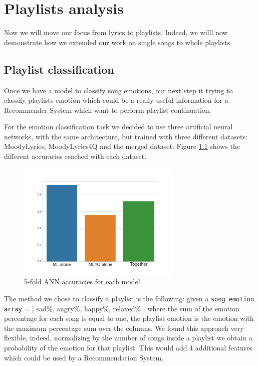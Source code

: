 \chapter{Playlists analysis}

Now we will move our focus from lyrics to playlists. Indeed, we willl now demonstrate how we extended our work on single songs to whole playlists.

\section{Playlist classification}

Once we have a model to classify song emotions, our next step it trying to classify playlists emotion which could be a really useful information for a Recommender System which want to perform playlist continuation.

For the emotion classification task we decided to use three artificial neural networks, with the same architecture, but trained with three different datasets: MoodyLyrics, MoodyLyrics4Q and the merged dataset. Figure \ref{fig:annacc} shows the different accuracies reached with each dataset. 

\begin{figure}[H]
\centering
\includegraphics[width=0.7\textwidth]{./chapters/chapter5/images/ANN_accuracies.png}
\caption{5-fold ANN accuracies for each model}
\label{fig:annacc}
\end{figure}

The method we chose to classify a playlist is the following: given a \texttt{song emotion array} = [ sad\%, angry\%, happy\%, relaxed\% ] where the sum of the emotion percentage for each song is equal to one, the playlist emotion is the emotion with the maximum percentage sum over the columns. We found this approach very flexible, indeed, normalizing by the number of songs inside a playlist we obtain a probability of the emotion for that playlist. This would add 4 additional features which could be used by a Recommendation System.

